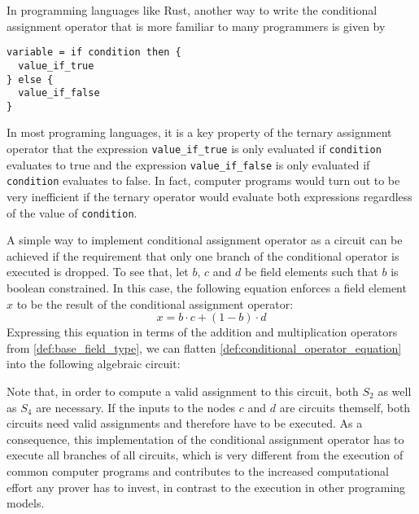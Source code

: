 In programming languages like Rust, another way to write the conditional assignment operator that is more familiar to many programmers is given by 
\begin{lstlisting}
variable = if condition then { 
  value_if_true 
} else { 
  value_if_false 
} 
\end{lstlisting}
In most programing languages, it is a key property of the ternary assignment operator that the expression \texttt{value\_if\_true} is only evaluated if \texttt{condition} evaluates to true and the expression \texttt{value\_if\_false} is only evaluated if \texttt{condition} evaluates to false. In fact, computer programs would turn out to be very inefficient if the ternary operator would evaluate both expressions regardless of the value of \texttt{condition}.

A simple way to implement conditional assignment operator as a circuit can be achieved if the requirement that only one branch of the conditional operator is executed is dropped. To see that, let $b$, $c$ and $d$ be field elements such that $b$ is boolean constrained. In this case, the following equation enforces a field element $x$ to be the result of the conditional assignment operator: 
\begin{equation}
\label{def:conditional_operator_equation}
x = b\cdot c + (1-b)\cdot d
\end{equation}
Expressing this equation in terms of the addition and multiplication operators from \ref{def:base_field_type}, we can flatten \ref{def:conditional_operator_equation} into the following algebraic circuit:
\begin{center}
\end{center}
Note that, in order to compute a valid assignment to this circuit, both $S_2$ as well as $S_4$ are necessary. If the inputs to the nodes $c$ and $d$ are circuits themself, both circuits need valid assignments and therefore have to be executed. As a consequence, this implementation of the conditional assignment operator has to execute all branches of all circuits, which is very different from the execution of common computer programs and contributes to the increased computational effort any prover has to invest, in contrast to the execution in other programing models. 

